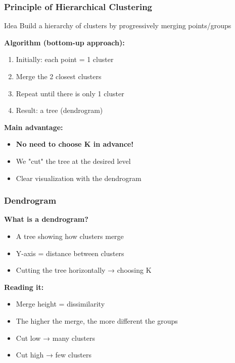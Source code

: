 \documentclass{beamer}
\begin{document}
\begin{frame}
\frametitle{Principle of Hierarchical Clustering}
\begin{block}{Idea}
Build a hierarchy of clusters by progressively merging points/groups
\end{block}

\vspace{0.5em}
\textbf{Algorithm (bottom-up approach):}
\begin{enumerate}
    \item Initially: each point = 1 cluster
    \item Merge the 2 closest clusters
    \item Repeat until there is only 1 cluster
    \item Result: a tree (dendrogram)
\end{enumerate}

\vspace{0.5em}
\textbf{Main advantage:}
\begin{itemize}
    \item \textbf{No need to choose K in advance!}
    \item We "cut" the tree at the desired level
    \item Clear visualization with the dendrogram
\end{itemize}
\end{frame}

\begin{frame}
\frametitle{Dendrogram}
\textbf{What is a dendrogram?}
\begin{itemize}
    \item A tree showing how clusters merge
    \item Y-axis = distance between clusters
    \item Cutting the tree horizontally → choosing K
\end{itemize}

\vspace{1em}
\textbf{Reading it:}
\begin{itemize}
    \item Merge height = dissimilarity
    \item The higher the merge, the more different the groups
    \item Cut low → many clusters
    \item Cut high → few clusters
\end{itemize}
\end{frame}
\end{document}
